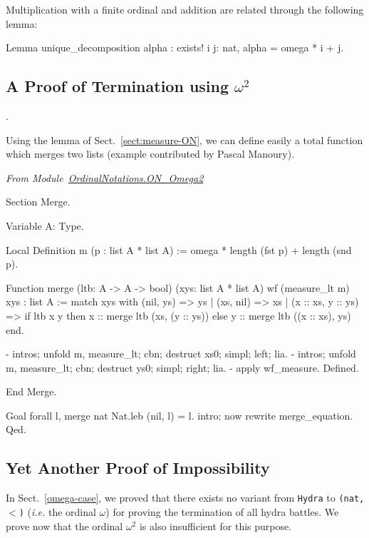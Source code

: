Multiplication with a finite ordinal and addition are related through the following lemma:

\begin{Coqsrc}
Lemma unique_decomposition alpha : 
    exists! i j: nat,  alpha = omega * i + j.
\end{Coqsrc}

\subsection{A Proof of Termination using \texorpdfstring{$\omega^2$}{omega^2}} 
\label{sect:merge-example}.

Using the lemma of Sect.~\vref{sect:measure-ON}, we can define easily a total function which merges two lists (example contributed by Pascal Manoury).


\vspace{4pt}
\noindent\emph{From Module~\href{../theories/html/hydras.OrdinalNotations.ON_Omega2.html}{OrdinalNotations.ON\_Omega2}}

\begin{Coqsrc}
Section Merge.

  Variable A: Type.

  Local Definition m (p : list A * list A) :=
    omega * length (fst p) + length (snd p).

  Function  merge  (ltb: A -> A -> bool)
          (xys: list A * list A)
          {wf (measure_lt m) xys} :
    list A :=
    match xys with
      (nil, ys) => ys
    | (xs, nil) => xs
    | (x :: xs, y :: ys) =>
      if ltb x y then x :: merge  ltb (xs, (y :: ys))
      else y :: merge  ltb ((x :: xs), ys)
    end.

  - intros; unfold m, measure_lt; cbn; destruct xs0; simpl; left; lia.
  - intros; unfold m, measure_lt; cbn; destruct ys0; simpl; right; lia.
  - apply wf_measure.
  Defined.

End Merge.

Goal forall l, merge nat Nat.leb (nil, l) = l.
  intro; now rewrite merge_equation.
Qed.
\end{Coqsrc}
 

\subsection{Yet Another  Proof of Impossibility}
\label{omega2-case}

In Sect.~\vref{omega-case}, we proved that there exists no variant from \texttt{Hydra} to \texttt{(nat,$<$)}
(\emph{i.e.} the ordinal $\omega$) for proving the termination of all hydra battles.
We  prove now that  the ordinal $\omega^2$ is also insufficient for this purpose. 

